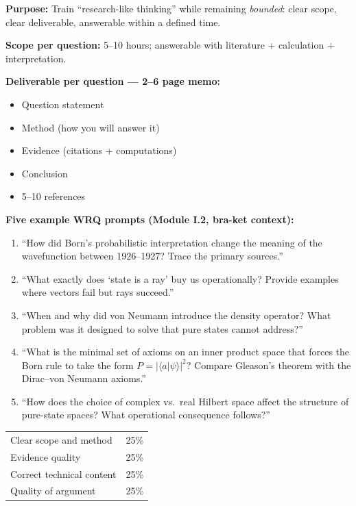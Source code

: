 \documentclass[11pt,a4paper]{article}
\begin{document}
\begin{tcolorbox}[researchbox, title={WRQ --- Well-Defined Research Questions \hfill\normalfont 5 questions}]

\textbf{Purpose:} Train ``research-like thinking'' while remaining \emph{bounded}:
clear scope, clear deliverable, answerable within a defined time.

\medskip\textbf{Scope per question:} 5--10 hours; answerable with literature +
calculation + interpretation.

\medskip\textbf{Deliverable per question --- 2--6 page memo:}
\begin{itemize}[leftmargin=1.5em,itemsep=2pt]
  \item Question statement
  \item Method (how you will answer it)
  \item Evidence (citations + computations)
  \item Conclusion
  \item 5--10 references
\end{itemize}

\medskip\textbf{Five example WRQ prompts (Module I.2, bra-ket context):}
\begin{enumerate}[leftmargin=2em,itemsep=4pt]
  \item ``How did Born's probabilistic interpretation change the meaning of the
        wavefunction between 1926--1927? Trace the primary sources.''
  \item ``What exactly does `state is a ray' buy us operationally? Provide
        examples where vectors fail but rays succeed.''
  \item ``When and why did von Neumann introduce the density operator? What problem
        was it designed to solve that pure states cannot address?''
  \item ``What is the minimal set of axioms on an inner product space that forces
        the Born rule to take the form $P=|\langle a|\psi\rangle|^2$? Compare
        Gleason's theorem with the Dirac--von Neumann axioms.''
  \item ``How does the choice of complex vs.\ real Hilbert space affect the
        structure of pure-state spaces? What operational consequence follows?''
\end{enumerate}
\end{tcolorbox}

\begin{tcolorbox}[rubricbox, title={WRQ Rubric (per question)}]
\begin{tabular}{ll}
  Clear scope and method    & 25\%\\
  Evidence quality          & 25\%\\
  Correct technical content & 25\%\\
  Quality of argument       & 25\%\\
\end{tabular}
\end{tcolorbox}
\end{document}
